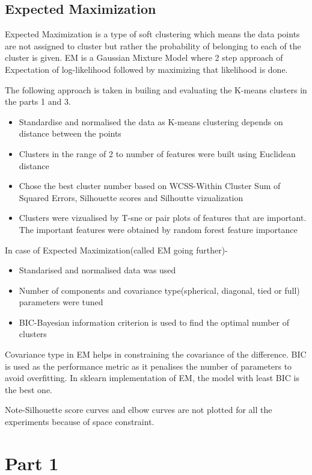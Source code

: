 \documentclass[12pt]{article}
\begin{document}
\subsection{Expected Maximization}
Expected Maximization is a type of soft clustering which means the data points are not assigned to cluster but rather the probability of belonging to each of the cluster is given. EM is a Gaussian Mixture Model where 2 step approach of Expectation of log-likelihood followed by maximizing that likelihood is done.

The following approach is taken in builing and evaluating the K-means clusters in the parts 1 and 3. 
\begin{itemize}

\item Standardise and normalised the data as K-means clustering depends on distance between the points
\item Clusters in the range of 2 to number of features were built using Euclidean distance
\item Chose the best cluster number based on WCSS-Within Cluster Sum of Squared Errors, Silhouette scores and Silhoutte vizualization
\item Clusters were vizualised by T-sne or pair plots of features that are important. The important features were obtained by random forest feature importance

\end{itemize}

In case of Expected Maximization(called EM going further)-
\begin{itemize}

\item Standarised and normalised data was used
\item Number of components and  covariance type(spherical, diagonal, tied or full) parameters were tuned
\item BIC-Bayesian information criterion is used to find the optimal number of clusters
\end{itemize}
Covariance type in EM helps in constraining the covariance of the difference. BIC is used as the performance metric as it penalises the number of parameters to avoid overfitting. In sklearn implementation of EM, the model with least BIC is the best one.

\*Note-Silhouette score curves and elbow curves are not plotted for all the experiments because of space constraint.


\section{Part 1}
\end{document}
